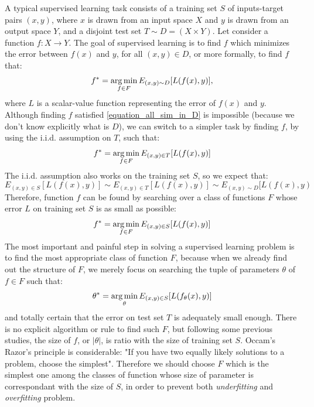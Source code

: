 A typical supervised learning task consists of a training set $\displaystyle S$ of inputs-target pairs $\displaystyle (x, y)$, where $\displaystyle x$ is drawn from an input space $\displaystyle X$ and $\displaystyle y$ is drawn from an output space $\displaystyle Y$, and a disjoint test set $\displaystyle T \sim D = (X \times Y)$. Let consider a function $\displaystyle f : X \rightarrow Y$. The goal of supervised learning is to find $\displaystyle f$ which minimizes the error between $\displaystyle f(x)$ and $\displaystyle y$, for all $\displaystyle (x,y) \in D$, or more formally, to find $\displaystyle f$ that:
\[ f^* = \operatorname*{arg\,min}_{f \in F} E_{(x,y) \sim D}[L(f(x),y)] \label{equation_all_sim_in_D}, \]
where $\displaystyle L$ is a scalar-value function representing the error of $\displaystyle f(x)$ and $\displaystyle y$. Although finding $\displaystyle f$ satisfied \eqref{equation_all_sim_in_D} is impossible (because we don't know explicitly what is $\displaystyle D$), we can switch to a simpler task by finding $\displaystyle f$, by using the i.i.d. assumption on $\displaystyle T$, such that:
\[ f^* = \operatorname*{arg\,min}_{f \in F} E_{(x,y) \in T}[L(f(x), y)]\]
The i.i.d. assumption also works on the training set $\displaystyle S$, so we expect that:
\[ E_{(x,y) \in S}[L(f(x), y)] \sim E_{(x,y) \in T}[L(f(x), y)] \sim E_{(x,y) \sim D}[L(f(x),y) \]
Therefore, function $\displaystyle f$ can be found by searching over a class of functions $\displaystyle F$ whose error $\displaystyle L$ on training set $\displaystyle S$ is as small as possible:
\[ f^* = \operatorname*{arg\,min}_{f \in F} E_{(x,y) \in S}[L(f(x), y)] \]
The most important and painful step in solving a supervised learning problem is to find the most appropriate class of function $\displaystyle F$, because when we already find out the structure of $\displaystyle F$, we merely focus on searching the tuple of parameters $\displaystyle \theta$ of $\displaystyle f \in F$ such that:
\[ {\theta}^{*} = \operatorname*{arg\,min}_{\theta}E_{(x,y) \in S}[L(f_{\theta}(x), y)] \label{equation_loss_in_train_set_of_f_theta} \]
and totally certain that the error on test set $\displaystyle T$ is adequately small enough. There is no explicit algorithm or rule to find such $\displaystyle F$, but following some previous studies, the size of $\displaystyle f$, or $|\theta|$, is ratio with the size of training set $\displaystyle S$. Occam's Razor's principle is considerable: "If you have two equally likely solutions to a problem, choose the simplest". Therefore we should choose $\displaystyle F$ which is the simplest one among the classes of function whose size of parameter is correspondant with the size of $\displaystyle S$, in order to prevent both \textit{underfitting} and \textit{overfitting} problem.



